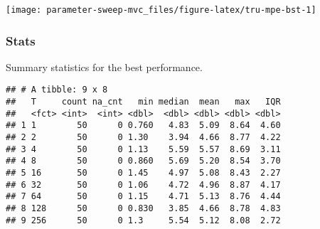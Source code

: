 \documentclass[]{book}
\newenvironment{Shaded}{\begin{snugshade}}{\end{snugshade}}
\newcommand{\DataTypeTok}[1]{\textcolor[rgb]{0.13,0.29,0.53}{#1}}
\newcommand{\KeywordTok}[1]{\textcolor[rgb]{0.13,0.29,0.53}{\textbf{#1}}}
\newcommand{\NormalTok}[1]{#1}
\newcommand{\OperatorTok}[1]{\textcolor[rgb]{0.81,0.36,0.00}{\textbf{#1}}}
\newcommand{\OtherTok}[1]{\textcolor[rgb]{0.56,0.35,0.01}{#1}}
\newcommand{\StringTok}[1]{\textcolor[rgb]{0.31,0.60,0.02}{#1}}
\begin{document}
\texttt{[image: parameter-sweep-mvc\_files/figure-latex/tru-mpe-bst-1]}

\hypertarget{stats-8}{%
\subsubsection{Stats}\label{stats-8}}

Summary statistics for the best performance.

\begin{Shaded}
\end{Shaded}

\begin{verbatim}
## # A tibble: 9 x 8
##   T     count na_cnt   min median  mean   max   IQR
##   <fct> <int>  <int> <dbl>  <dbl> <dbl> <dbl> <dbl>
## 1 1        50      0 0.760   4.83  5.09  8.64  4.60
## 2 2        50      0 1.30    3.94  4.66  8.77  4.22
## 3 4        50      0 1.13    5.59  5.57  8.69  3.11
## 4 8        50      0 0.860   5.69  5.20  8.54  3.70
## 5 16       50      0 1.45    4.97  5.08  8.43  2.27
## 6 32       50      0 1.06    4.72  4.96  8.87  4.17
## 7 64       50      0 1.15    4.71  5.13  8.76  4.44
## 8 128      50      0 0.830   3.85  4.66  8.78  4.83
## 9 256      50      0 1.3     5.54  5.12  8.08  2.72
\end{verbatim}
\end{document}
